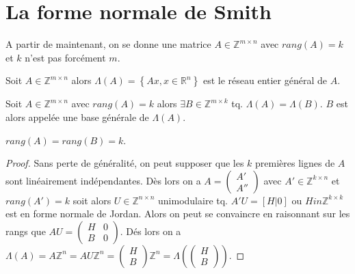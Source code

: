 \section{La forme normale de Smith}
\label{sec:la-forme-normale-1}

A partir de maintenant, on se donne une matrice $A\in \mathbb{Z}^{m\times n}$ avec $rang(A)=k$ et $k$ n'est pas forcément $m$.

\begin{definition}
   	\label{def:49}
	Soit  $A\in \mathbb{Z}^{m\times n}$ alors $\Lambda(A)=\left\{ Ax,x\in \mathbb{R}^{n} \right\} $ est le réseau entier général de $A$.
\end{definition}

\begin{theorem}
    \label{thr:28}
    Soit  $A\in \mathbb{Z}^{m\times n}$ avec $rang(A)=k$ alors $\exists B \in \mathbb{Z}^{m \times k}$ tq. $\Lambda(A)=\Lambda(B)$. $B$ est alors appelée une base générale de $\Lambda(A)$.
    \end{theorem}
    
	  \begin{remark}
    \label{rem:5}
    $rang(A)=rang(B)=k$.
    \end{remark}
    
    \begin{proof}
    Sans perte de généralité, on peut supposer que les $k$ premières lignes de $A$ sont linéairement indépendantes. 
    Dès lors on a $A=\begin{pmatrix} A' \\ A'' \end{pmatrix}$ avec $A'\in \mathbb{Z}^{k \times n}$ et $rang(A')=k$ soit alors $U\in \mathbb{Z}^{n \times n}$ unimodulaire tq. $A'U=[H|0]$ ou $H in \mathbb{Z}^{k \times k}$ est en forme normale de Jordan. Alors on peut se convaincre en raisonnant sur les rangs que $AU=\begin{pmatrix} H & 0 \\ B & 0 \end{pmatrix}$. Dés lors on a $\Lambda(A)=A\mathbb{Z}^n=AU\mathbb{Z}^n=\begin{pmatrix} H \\ B \end{pmatrix}\mathbb{Z}^n=\Lambda(\begin{pmatrix} H \\ B \end{pmatrix})$.
    
    \end{proof}
    
